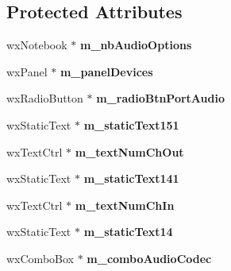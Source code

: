 \subsection*{Protected Attributes}
\begin{DoxyCompactItemize}
\item 
\hypertarget{class_dlg_audio_ac45627cdbbcdaa2e3400c08f6fe9cfe6}{wx\-Notebook $\ast$ {\bfseries m\-\_\-nb\-Audio\-Options}}\label{class_dlg_audio_ac45627cdbbcdaa2e3400c08f6fe9cfe6}

\item 
\hypertarget{class_dlg_audio_a74808776e03014a3b3dcbf03bb8f6dbe}{wx\-Panel $\ast$ {\bfseries m\-\_\-panel\-Devices}}\label{class_dlg_audio_a74808776e03014a3b3dcbf03bb8f6dbe}

\item 
\hypertarget{class_dlg_audio_a44c3e54a014e7a4e921398bddc6681c7}{wx\-Radio\-Button $\ast$ {\bfseries m\-\_\-radio\-Btn\-Port\-Audio}}\label{class_dlg_audio_a44c3e54a014e7a4e921398bddc6681c7}

\item 
\hypertarget{class_dlg_audio_a6cdf994e898954407e2b064e3aa5b0b7}{wx\-Static\-Text $\ast$ {\bfseries m\-\_\-static\-Text151}}\label{class_dlg_audio_a6cdf994e898954407e2b064e3aa5b0b7}

\item 
\hypertarget{class_dlg_audio_a35f852fc3c494b83ceb14d2d5c1ad6db}{wx\-Text\-Ctrl $\ast$ {\bfseries m\-\_\-text\-Num\-Ch\-Out}}\label{class_dlg_audio_a35f852fc3c494b83ceb14d2d5c1ad6db}

\item 
\hypertarget{class_dlg_audio_ac99a630f69e15e73d3942d0338ccae66}{wx\-Static\-Text $\ast$ {\bfseries m\-\_\-static\-Text141}}\label{class_dlg_audio_ac99a630f69e15e73d3942d0338ccae66}

\item 
\hypertarget{class_dlg_audio_a0d5cd2fc25435939bf8ca2dc2c4fa9b7}{wx\-Text\-Ctrl $\ast$ {\bfseries m\-\_\-text\-Num\-Ch\-In}}\label{class_dlg_audio_a0d5cd2fc25435939bf8ca2dc2c4fa9b7}

\item 
\hypertarget{class_dlg_audio_adfd283017fa96c14f349368961bd4737}{wx\-Static\-Text $\ast$ {\bfseries m\-\_\-static\-Text14}}\label{class_dlg_audio_adfd283017fa96c14f349368961bd4737}

\item 
\hypertarget{class_dlg_audio_ac59893eccfb75467afd792051119067c}{wx\-Combo\-Box $\ast$ {\bfseries m\-\_\-combo\-Audio\-Codec}}\label{class_dlg_audio_ac59893eccfb75467afd792051119067c}


\end{DoxyCompactItemize}
